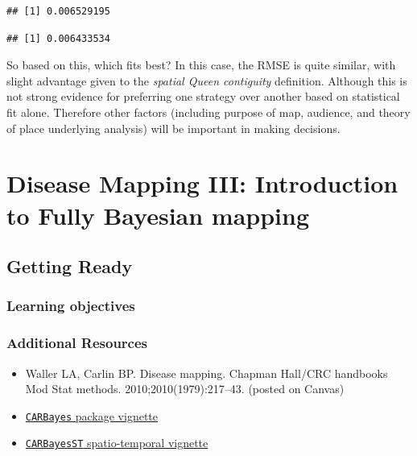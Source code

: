 \documentclass[
]{book}
\newenvironment{Shaded}{\begin{snugshade}}{\end{snugshade}}
\newcommand{\FunctionTok}[1]{\textcolor[rgb]{0.00,0.00,0.00}{#1}}
\newcommand{\NormalTok}[1]{#1}
\newcommand{\SpecialCharTok}[1]{\textcolor[rgb]{0.00,0.00,0.00}{#1}}
\providecommand{\tightlist}{%
  \setlength{\itemsep}{0pt}\setlength{\parskip}{0pt}}
\begin{document}
\begin{verbatim}
## [1] 0.006529195
\end{verbatim}

\begin{Shaded}
\end{Shaded}

\begin{verbatim}
## [1] 0.006433534
\end{verbatim}

So based on this, which fits best? In this case, the RMSE is quite similar, with slight advantage given to the \emph{spatial Queen contiguity} definition. Although this is not strong evidence for preferring one strategy over another based on statistical fit alone. Therefore other factors (including purpose of map, audience, and theory of place underlying analysis) will be important in making decisions.

\hypertarget{disease-mapping-iii-introduction-to-fully-bayesian-mapping}{%
\chapter{Disease Mapping III: Introduction to Fully Bayesian mapping}\label{disease-mapping-iii-introduction-to-fully-bayesian-mapping}}

\hypertarget{getting-ready-4}{%
\section{Getting Ready}\label{getting-ready-4}}

\hypertarget{learning-objectives-5}{%
\subsection{Learning objectives}\label{learning-objectives-5}}

\hypertarget{additional-resources-5}{%
\subsection{Additional Resources}\label{additional-resources-5}}

\begin{itemize}
\tightlist
\item
  Waller LA, Carlin BP. Disease mapping. Chapman Hall/CRC handbooks Mod Stat methods. 2010;2010(1979):217--43. (posted on Canvas)
\item
  \href{https://cran.r-project.org/web/packages/CARBayes/vignettes/CARBayes.pdf}{\texttt{CARBayes} package vignette}
\item
  \href{https://cran.r-project.org/web/packages/CARBayes/vignettes/CARBayes.pdf}{\texttt{CARBayesST} spatio-temporal vignette}
\end{itemize}
\end{document}
